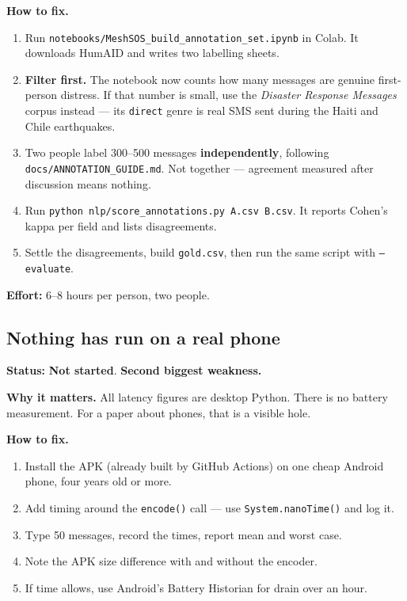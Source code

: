 \documentclass[11pt,a4paper]{article}
\newcommand{\todo}{\textcolor{bad}{\textbf{Not started}}}
\begin{document}
\textbf{How to fix.}
\begin{enumerate}
\item Run \texttt{notebooks/MeshSOS\_build\_annotation\_set.ipynb} in Colab.
      It downloads HumAID and writes two labelling sheets.
\item \textbf{Filter first.} The notebook now counts how many messages are
      genuine first-person distress. If that number is small, use the
      \emph{Disaster Response Messages} corpus instead --- its
      \texttt{direct} genre is real SMS sent during the Haiti and Chile
      earthquakes.
\item Two people label 300--500 messages \textbf{independently}, following
      \texttt{docs/ANNOTATION\_GUIDE.md}. Not together --- agreement measured
      after discussion means nothing.
\item Run \texttt{python nlp/score\_annotations.py A.csv B.csv}. It reports
      Cohen's kappa per field and lists disagreements.
\item Settle the disagreements, build \texttt{gold.csv}, then run the same
      script with \texttt{--evaluate}.
\end{enumerate}

\textbf{Effort:} 6--8 hours per person, two people.

\subsection{Nothing has run on a real phone}

\textbf{Status:} \todo. \textbf{Second biggest weakness.}

\textbf{Why it matters.} All latency figures are desktop Python. There is no
battery measurement. For a paper about phones, that is a visible hole.

\textbf{How to fix.}
\begin{enumerate}
\item Install the APK (already built by GitHub Actions) on one cheap Android
      phone, four years old or more.
\item Add timing around the \texttt{encode()} call --- use
      \texttt{System.nanoTime()} and log it.
\item Type 50 messages, record the times, report mean and worst case.
\item Note the APK size difference with and without the encoder.
\item If time allows, use Android's Battery Historian for drain over an hour.
\end{enumerate}
\end{document}
